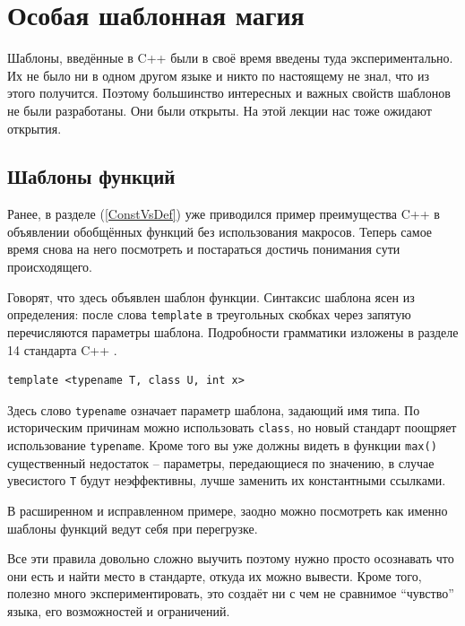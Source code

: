 \documentclass[a4paper,12pt,oneside]{article}
\begin{document}
\pagebreak
\section{Особая шаблонная магия}

Шаблоны, введённые в C++ были в своё время введены туда экспериментально. Их не было ни в одном другом языке и никто по настоящему не знал, что из этого получится. Поэтому большинство интересных и важных свойств шаблонов не были разработаны. Они были открыты. На этой лекции нас тоже ожидают открытия.

\subsection{Шаблоны функций}

Ранее, в разделе (\ref{ConstVsDef}) уже приводился пример преимущества C++ в объявлении обобщённых функций без использования макросов. Теперь самое время снова на него посмотреть и постараться достичь понимания сути происходящего.



Говорят, что здесь объявлен шаблон функции. Синтаксис шаблона ясен из определения: после слова \lstinline!template! в треугольных скобках через запятую перечисляются параметры шаблона. Подробности грамматики изложены в разделе 14 стандарта C++ \cite{stdcpp98}.

\begin{lstlisting}
template <typename T, class U, int x>
\end{lstlisting}

Здесь слово \lstinline!typename! означает параметр шаблона, задающий имя типа. По историческим причинам можно использовать \lstinline!class!, но новый стандарт поощряет использование \lstinline!typename!. Кроме того вы уже должны видеть в функции \lstinline!max()! существенный недостаток – параметры, передающиеся по значению, в случае увесистого \lstinline!T! будут неэффективны, лучше заменить их константными ссылками.

В расширенном и исправленном примере, заодно можно посмотреть как именно шаблоны функций ведут себя при перегрузке.



Все эти правила довольно сложно выучить поэтому нужно просто осознавать что они есть и найти место в стандарте, откуда их можно вывести. Кроме того, полезно много экспериментировать, это создаёт ни с чем не сравнимое ``чувство'' языка, его возможностей и ограничений.
\end{document}

